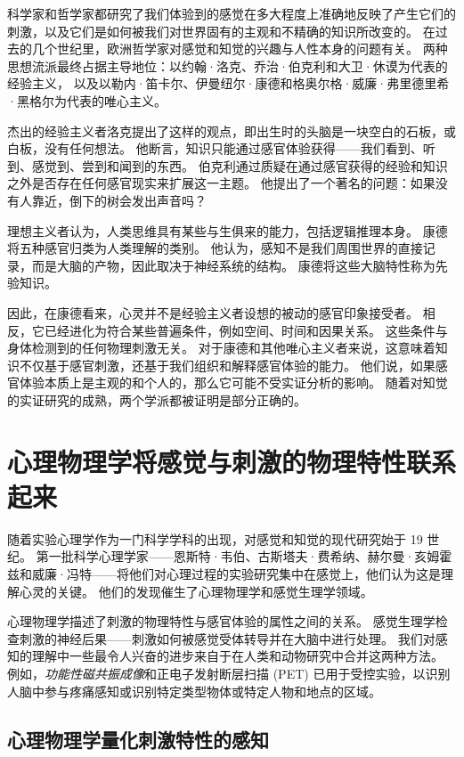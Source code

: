 科学家和哲学家都研究了我们体验到的感觉在多大程度上准确地反映了产生它们的刺激，以及它们是如何被我们对世界固有的主观和不精确的知识所改变的。 
在过去的几个世纪里，欧洲哲学家对感觉和知觉的兴趣与人性本身的问题有关。 
两种思想流派最终占据主导地位：以约翰·洛克、乔治·伯克利和大卫·休谟为代表的经验主义，
以及以勒内·笛卡尔、伊曼纽尔·康德和格奥尔格·威廉·弗里德里希·黑格尔为代表的唯心主义。


杰出的经验主义者洛克提出了这样的观点，即出生时的头脑是一块空白的石板，或白板，没有任何想法。 
他断言，知识只能通过感官体验获得——我们看到、听到、感觉到、尝到和闻到的东西。 
伯克利通过质疑在通过感官获得的经验和知识之外是否存在任何感官现实来扩展这一主题。 
他提出了一个著名的问题：如果没有人靠近，倒下的树会发出声音吗？


理想主义者认为，人类思维具有某些与生俱来的能力，包括逻辑推理本身。 
康德将五种感官归类为人类理解的类别。 
他认为，感知不是我们周围世界的直接记录，而是大脑的产物，因此取决于神经系统的结构。 
康德将这些大脑特性称为先验知识。


因此，在康德看来，心灵并不是经验主义者设想的被动的感官印象接受者。 
相反，它已经进化为符合某些普遍条件，例如空间、时间和因果关系。 
这些条件与身体检测到的任何物理刺激无关。 
对于康德和其他唯心主义者来说，这意味着知识不仅基于感官刺激，还基于我们组织和解释感官体验的能力。 
他们说，如果感官体验本质上是主观的和个人的，那么它可能不受实证分析的影响。
随着对知觉的实证研究的成熟，两个学派都被证明是部分正确的。


\section{心理物理学将感觉与刺激的物理特性联系起来}
随着实验心理学作为一门科学学科的出现，对感觉和知觉的现代研究始于 19 世纪。 
第一批科学心理学家——恩斯特·韦伯、古斯塔夫·费希纳、赫尔曼·亥姆霍兹和威廉·冯特——将他们对心理过程的实验研究集中在感觉上，他们认为这是理解心灵的关键。 
他们的发现催生了心理物理学和感觉生理学领域。


心理物理学描述了刺激的物理特性与感官体验的属性之间的关系。 
感觉生理学检查刺激的神经后果——刺激如何被感觉受体转导并在大脑中进行处理。 
我们对感知的理解中一些最令人兴奋的进步来自于在人类和动物研究中合并这两种方法。 
例如，\textit{功能性磁共振成像}和正电子发射断层扫描 (PET) 已用于受控实验，以识别人脑中参与疼痛感知或识别特定类型物体或特定人物和地点的区域。


\subsection{心理物理学量化刺激特性的感知}

